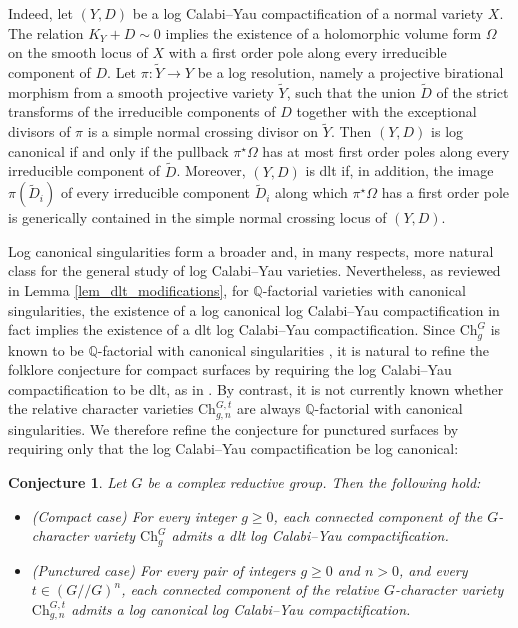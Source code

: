 \documentclass[12pt,letterpaper, reqno]{amsart}
\newtheorem{conjecture}[theorem]{Conjecture}
\theoremstyle{defstyle} \newtheorem{definition}[theorem]{Definition}
\theoremstyle{remark}
\numberwithin{equation}{section}
\numberwithin{figure}{section}
\newcommand{\QQ} {\mathbb{Q}}
\begin{document}
Indeed, let $(Y,D)$ be a log Calabi--Yau compactification of a normal variety $X$. The relation $K_Y+D\sim 0$ implies the existence of a holomorphic volume form $\Omega$ on the smooth locus of $X$ with a first order pole along every irreducible component of $D$. Let $\pi:\widetilde{Y}\to Y$ be a log resolution, namely a projective birational morphism from a smooth projective variety $\widetilde{Y}$, such that the union $\widetilde{D}$ of the strict transforms of the irreducible components of $D$ together with the exceptional divisors of $\pi$ is a simple normal crossing divisor on $\widetilde{Y}$. Then $(Y,D)$ is log canonical if and only if the pullback $\pi^\star\Omega$ has at most first order poles along every irreducible component of $\widetilde{D}$. Moreover, $(Y,D)$ is dlt if, in addition, the image $\pi(\widetilde{D}_i)$ of every irreducible component $\widetilde{D}_i$ along which $\pi^\star\Omega$ has a first order pole is generically contained in the simple normal crossing locus of $(Y,D)$.


Log canonical singularities form a broader and, in many respects, more natural class for the general study of log Calabi--Yau varieties. Nevertheless, as reviewed in Lemma \ref{lem_dlt_modifications}, for $\QQ$-factorial varieties with canonical singularities, the existence of a log canonical log Calabi--Yau compactification in fact implies the existence of a dlt log Calabi--Yau compactification. Since $\mathrm{Ch}_g^G$ is known to be $\QQ$-factorial with canonical singularities \cite{shu2024singularities}, it is natural to refine the folklore conjecture for compact surfaces by requiring the log Calabi--Yau compactification to be dlt, as in \cite[Conjecture 1.3.1]{mauri2022geometric}. By contrast, it is not currently known whether the relative character varieties $\mathrm{Ch}_{g,n}^{G,t}$ are always $\QQ$-factorial with canonical singularities. We therefore refine the conjecture for punctured surfaces by requiring only that the log Calabi--Yau compactification be log canonical:


\begin{conjecture}\label{conj_main}
Let $G$ be a complex reductive group. Then the following hold:
\begin{itemize}
\item[(i)] \emph{(Compact case)}
For every integer $g\geq 0$, each connected component of the $G$-character variety $\mathrm{Ch}_g^G$ admits a dlt log Calabi--Yau compactification.

\item[(ii)] \emph{(Punctured case)}
For every pair of integers $g\geq 0$ and $n>0$, and every $t\in (G//G)^n$, each connected component of the relative $G$-character variety $\mathrm{Ch}_{g,n}^{G,t}$ admits a log canonical log Calabi--Yau compactification.
\end{itemize}
\end{conjecture}
\end{document}
